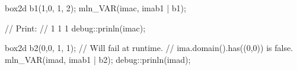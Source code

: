 box2d b1(1,0, 1, 2);
mln_VAR(imac, imab1 | b1);

// Print:
// 1 1 1
debug::prinln(imac);

box2d b2(0,0, 1, 1);
// Will fail at runtime.
// ima.domain().has((0,0)) is false.
mln_VAR(imad, imab1 | b2);
debug::prinln(imad);
